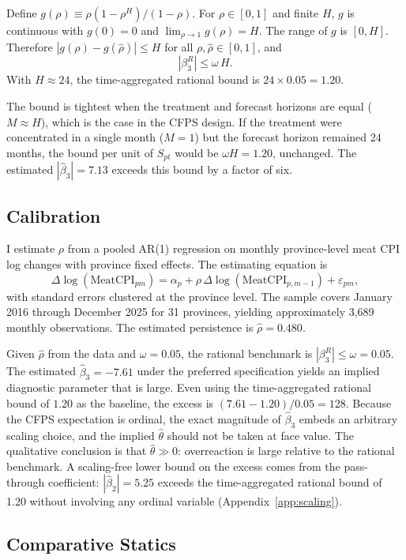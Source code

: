 Define $g(\rho) \equiv \rho(1-\rho^H)/(1-\rho)$.
For $\rho \in [0,1]$ and finite $H$, $g$ is continuous with
$g(0) = 0$ and $\lim_{\rho \to 1} g(\rho) = H$.
The range of $g$ is $[0, H]$.
Therefore
$|g(\rho) - g(\hat{\rho})| \leq H$ for all
$\rho, \hat{\rho} \in [0,1]$, and
\[
  |\beta_3^R| \leq \omega\,H.
\]
With $H \approx 24$, the time-aggregated rational bound is
$24 \times 0.05 = 1.20$.

The bound is tightest when the treatment and forecast horizons
are equal ($M \approx H$), which is the case in the CFPS
design.
If the treatment were concentrated in a single month ($M = 1$)
but the forecast horizon remained 24 months, the bound per unit
of $S_{pt}$ would be $\omega H = 1.20$, unchanged.
The estimated $|\hat{\beta}_3| = 7.13$ exceeds this bound by a
factor of six.

\subsection{Calibration}

I estimate $\rho$ from a pooled AR(1) regression on monthly
province-level meat CPI log changes with province fixed effects.
The estimating equation is
\[
  \Delta \log(\mathrm{MeatCPI}_{pm})
  = \alpha_p
  + \rho\,\Delta \log(\mathrm{MeatCPI}_{p,m-1})
  + \varepsilon_{pm},
\]
with standard errors clustered at the province level.
The sample covers January 2016 through December 2025 for 31
provinces, yielding approximately 3,689 monthly observations.
The estimated persistence is $\hat{\rho} = 0.480$.

Given $\hat{\rho}$ from the data and $\omega = 0.05$, the
rational benchmark is
$|\beta_3^R| \leq \omega = 0.05$.
The estimated $\hat{\beta}_3 = -7.61$ under the preferred
specification yields an implied diagnostic parameter that is
large.
Even using the time-aggregated rational bound of $1.20$ as
the baseline, the excess is
$(7.61 - 1.20)/0.05 = 128$.
Because the CFPS expectation is ordinal, the exact magnitude
of $\hat{\beta}_3$ embeds an arbitrary scaling choice, and
the implied $\hat{\theta}$ should not be taken at face value.
The qualitative conclusion is that $\hat{\theta} \gg 0$:
overreaction is large relative to the rational benchmark.
A scaling-free lower bound on the excess comes from the
pass-through coefficient: $|\hat{\beta}_2| = 5.25$ exceeds
the time-aggregated rational bound of 1.20 without involving
any ordinal variable (Appendix~\ref{app:scaling}).

\subsection{Comparative Statics}

